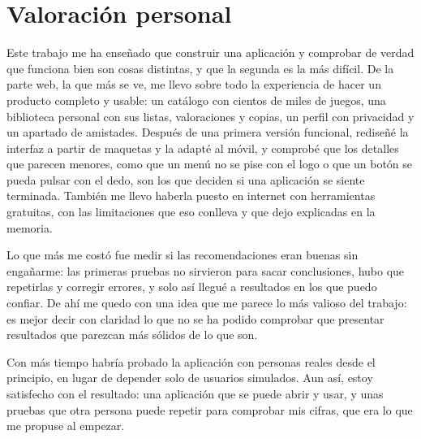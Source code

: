 \section{Valoración personal}\label{sec:conc-valoracion-personal}

Este trabajo me ha enseñado que construir una aplicación y comprobar de verdad que funciona bien son cosas distintas, y
que la segunda es la más difícil. De la parte web, la que más se ve, me llevo sobre todo la experiencia de hacer un
producto completo y usable: un catálogo con cientos de miles de juegos, una biblioteca personal con sus listas,
valoraciones y copias, un perfil con privacidad y un apartado de amistades. Después de una primera versión funcional,
rediseñé la interfaz a partir de maquetas y la adapté al móvil, y comprobé que los detalles que parecen menores, como
que un menú no se pise con el logo o que un botón se pueda pulsar con el dedo, son los que deciden si una aplicación se
siente terminada. También me llevo haberla puesto en internet con herramientas gratuitas, con las limitaciones que eso
conlleva y que dejo explicadas en la memoria.

Lo que más me costó fue medir si las recomendaciones eran buenas sin engañarme: las primeras pruebas no sirvieron para
sacar conclusiones, hubo que repetirlas y corregir errores, y solo así llegué a resultados en los que puedo confiar. De
ahí me quedo con una idea que me parece lo más valioso del trabajo: es mejor decir con claridad lo que no se ha podido
comprobar que presentar resultados que parezcan más sólidos de lo que son.

Con más tiempo habría probado la aplicación con personas reales desde el principio, en lugar de depender solo de usuarios
simulados. Aun así, estoy satisfecho con el resultado: una aplicación que se puede abrir y usar, y unas pruebas que otra
persona puede repetir para comprobar mis cifras, que era lo que me propuse al empezar.
